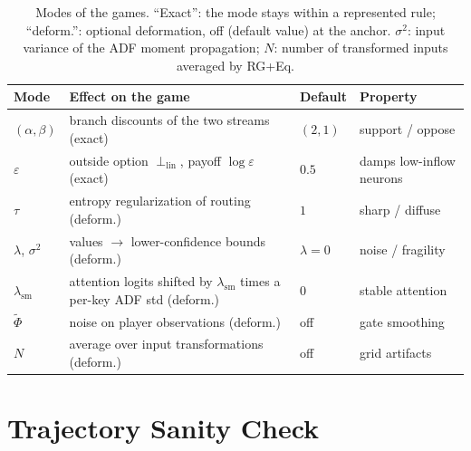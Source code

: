 \documentclass[twoside]{article}
\newcommand{\1}{\mathbf{1}}
\begin{document}
\begin{table}[t]
    \centering
    \caption{Modes of the games. ``Exact'': the mode stays within a represented rule; ``deform.'':
    optional deformation, off (default value) at the anchor. $\sigma^2$: input variance of the \ac{ADF}
    moment propagation; $N$: number of transformed inputs averaged by \ac{RG}+Eq.}\label{tab:modes}
    \small
    \setlength{\tabcolsep}{4pt}
    \begin{tabularx}{\textwidth}{@{}>{\raggedright\arraybackslash}p{}>{\raggedright\arraybackslash}X>{\raggedright\arraybackslash}p{}>{\raggedright\arraybackslash}p{}@{}}
        \toprule
        \textbf{Mode} & \textbf{Effect on the game} & \textbf{Default} & \textbf{Property} \\
        \midrule
        $(\alpha,\beta)$ & branch discounts of the two streams (exact) & $(2,1)$ & support / oppose \\
        $\varepsilon$ & outside option $\perp_{\mathrm{lin}}$, payoff $\log\varepsilon$ (exact) & $0.5$ &
        damps low-inflow neurons \\
        $\tau$ & entropy regularization of routing (deform.) & $1$ & sharp / diffuse \\
        $\lambda$, $\sigma^2$ & values $\to$ lower-confidence bounds (deform.) & $\lambda{=}0$ & noise /
        fragility \\
        $\lambda_{\mathrm{sm}}$ & attention logits shifted by $\lambda_{\mathrm{sm}}$ times a per-key
        \ac{ADF} std (deform.) & $0$ & stable attention \\
        $\tilde\Phi$ & noise on player observations (deform.) & off & gate smoothing \\
        $N$ & average over input transformations (deform.) & off & grid artifacts \\
        \bottomrule
    \end{tabularx}
\end{table}

\section{Trajectory Sanity Check}\label{sec:hellinger-sanity}\label{sec:hellinger}
\end{document}
